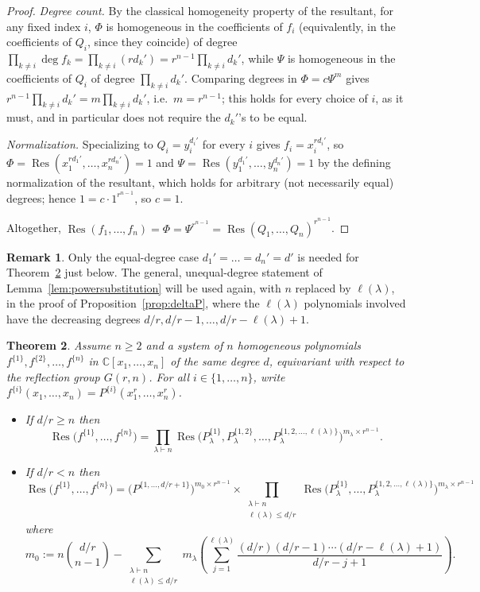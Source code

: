 \documentclass[12pt]{amsart}
\newtheorem{theorem}{Theorem}[section]
\theoremstyle{definition}
\newtheorem{remark}[theorem]{Remark}
\newcommand{\Res}{\operatorname{Res}}
\DeclareMathOperator{\len}{\ell}
\begin{document}
\begin{proof}
\emph{Degree count.} By the classical homogeneity property of the resultant, for any fixed index $i$, $\Phi$ is homogeneous in the coefficients of $f_i$ (equivalently, in the coefficients of $Q_i$, since they coincide) of degree $\prod_{k \ne i}\deg f_k = \prod_{k\ne i}(rd_k') = r^{n-1}\prod_{k\ne i}d_k'$, while $\Psi$ is homogeneous in the coefficients of $Q_i$ of degree $\prod_{k\ne i}d_k'$. Comparing degrees in $\Phi = c\Psi^m$ gives $r^{n-1}\prod_{k\ne i}d_k' = m\prod_{k\ne i}d_k'$, i.e.\ $m = r^{n-1}$; this holds for every choice of $i$, as it must, and in particular does not require the $d_k'$'s to be equal.

\emph{Normalization.} Specializing to $Q_i = y_i^{d_i'}$ for every $i$ gives $f_i = x_i^{rd_i'}$, so $\Phi = \Res(x_1^{rd_1'},\dots,x_n^{rd_n'}) = 1$ and $\Psi = \Res(y_1^{d_1'},\dots,y_n^{d_n'}) = 1$ by the defining normalization of the resultant, which holds for arbitrary (not necessarily equal) degrees; hence $1 = c\cdot 1^{r^{n-1}}$, so $c=1$.

Altogether, $\Res(f_1,\dots,f_n) = \Phi = \Psi^{r^{n-1}} = \Res(Q_1,\dots,Q_n)^{r^{n-1}}$.
\end{proof}

\begin{remark}
Only the equal-degree case $d_1' = \dots = d_n' = d'$ is needed for Theorem~\ref{thm:main1} just below. The general, unequal-degree statement of Lemma~\ref{lem:powersubstitution} will be used again, with $n$ replaced by $\len(\lambda)$, in the proof of Proposition~\ref{prop:deltaP}, where the $\len(\lambda)$ polynomials involved have the decreasing degrees $d/r, d/r-1,\dots,d/r-\len(\lambda)+1$.
\end{remark}

\begin{theorem}
\label{thm:main1}
Assume $n \geqslant 2$ and a system of $n$ homogeneous polynomials $f^{\{1\}},f^{\{2\}},\dots,f^{\{n\}}$ in $\mathbb{C}[x_1,\dots,x_n]$ of the same degree $d$, equivariant with respect to the reflection group $G(r,n)$. For all $i \in \{1,\dots,n\}$, write $f^{\{i\}}(x_1,\dots,x_n) = P^{\{i\}}(x_1^r,\dots,x_n^r)$.
\begin{itemize}
\item If $d/r \geqslant n$ then
\[
\Res\big(f^{\{1\}},\dots,f^{\{n\}}\big) = \prod_{\lambda \vdash n} \Res\Big(P^{\{1\}}_\lambda, P^{\{1,2\}}_\lambda,\dots,P^{\{1,2,\dots,\len(\lambda)\}}_\lambda\Big)^{m_\lambda \times r^{n-1}}.
\]
\item If $d/r < n$ then
\[
\Res\big(f^{\{1\}},\dots,f^{\{n\}}\big) = \Big(P^{\{1,\dots,d/r+1\}}\Big)^{m_0 \times r^{n-1}} \times \prod_{\substack{\lambda \vdash n \\ \len(\lambda) \leqslant d/r}} \Res\Big(P^{\{1\}}_\lambda,\dots,P^{\{1,2,\dots,\len(\lambda)\}}_\lambda\Big)^{m_\lambda\times r^{n-1}}
\]
where
\[
m_0 := n\binom{d/r}{n-1} - \sum_{\substack{\lambda \vdash n\\ \len(\lambda)\leqslant d/r}} m_\lambda \left(\sum_{j=1}^{\len(\lambda)} \frac{(d/r)(d/r-1)\cdots(d/r-\len(\lambda)+1)}{d/r - j + 1}\right).
\]
\end{itemize}
\end{theorem}
\end{document}
